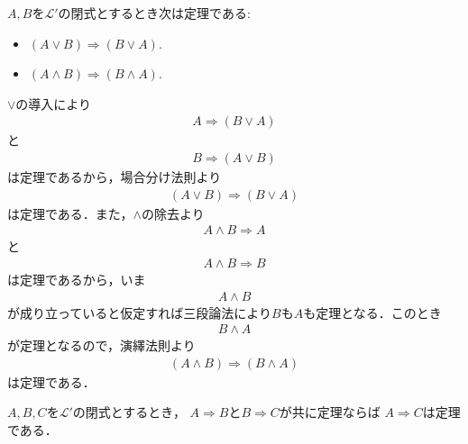 	\begin{screen}
		\begin{logicalthm}
		\label{logicalthm:commutative_law_of_disjunction_and_conjunction}
			$A,B$を$\mathcal{L}'$の閉式とするとき次は定理である:
			\begin{itemize}
				\item $(A \vee B) \Longrightarrow (B \vee A)$.
				\item $(A \wedge B) \Longrightarrow (B \wedge A)$.
			\end{itemize}
		\end{logicalthm}
	\end{screen}
	
	\begin{prf}
		$\vee$の導入により
		\begin{align}
			A \Longrightarrow (B \vee A)
		\end{align}
		と
		\begin{align}
			B \Longrightarrow (A \vee B)
		\end{align}
		は定理であるから，場合分け法則より
		\begin{align}
			(A \vee B) \Longrightarrow (B \vee A)
		\end{align}
		は定理である．また，$\wedge$の除去より
		\begin{align}
			A \wedge B \Longrightarrow A
		\end{align}
		と
		\begin{align}
			A \wedge B \Longrightarrow B
		\end{align}
		は定理であるから，いま
		\begin{align}
			A \wedge B
		\end{align}
		が成り立っていると仮定すれば三段論法により$B$も$A$も定理となる．このとき
		\begin{align}
			B \wedge A
		\end{align}
		が定理となるので，演繹法則より
		\begin{align}
			(A \wedge B) \Longrightarrow (B \wedge A)
		\end{align}
		は定理である．
		\QED
	\end{prf}
	
	\begin{screen}
		\begin{logicalthm}[含意の推移律]\label{logicalthm:transitive_law_of_implication}
			$A,B,C$を$\mathcal{L}'$の閉式とするとき，
			$A \Longrightarrow B$と$B \Longrightarrow C$が共に定理ならば
			$A \Longrightarrow C$は定理である．
		\end{logicalthm}
	\end{screen}
	
